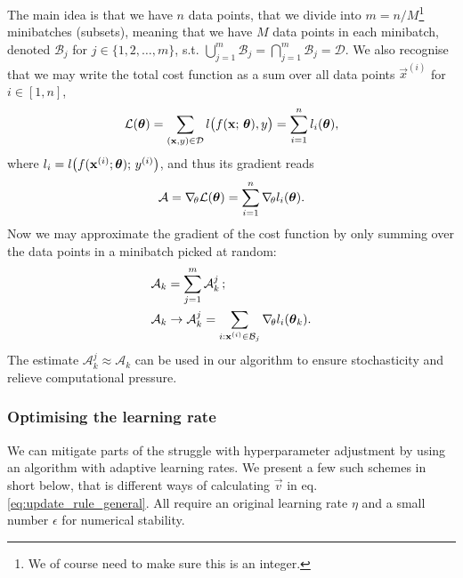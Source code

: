         The main idea is that we have $n$ data points, that we divide into $m=n/M$\footnote{We of course need to make sure this is an integer. } minibatches (subsets), meaning that we have $M$ data points in each minibatch, denoted $\mathcal{B}_j$ for $j\in\{1,2,\dots,m\}$, s.t. $\bigcup_{j=1}^m \mathcal{B}_j = \bigcap_{j=1}^m \mathcal{B}_j = \mathcal{D}$. We also recognise that we may write the total cost function as a sum over all data points $\vec{x}^{(i)}$ for $i\in[1,n]$, 
        \begin{equation}
            \mathcal{L}(\boldsymbol{\theta}) =\sum_{(\mathbf{x}, y)\in \mathcal{D}} l\big(f(\mathbf{x};\,\boldsymbol{\theta}), y \big) = \sum_{i=1}^n l_i(\boldsymbol{\theta}),
        \end{equation}
        where $l_i = l\big(f(\mathbf{x}^{(i)};\boldsymbol{\theta}); \, y^{(i)}\big)$, and thus its gradient reads
        \begin{equation}
            \mathcal{A} = \nabla_{\!\theta} \mathcal{L}(\boldsymbol{\theta}) = \sum_{i=1}^n \nabla_{\!\theta}l_i(\boldsymbol{\theta}).
        \end{equation}
        Now we may approximate the gradient of the cost function by only summing over the data points in a minibatch picked at random:
        \begin{equation}\label{eq:sgd_gradient}
            \begin{split}
            \mathcal{A}_k &= \sum_{j=1}^{m}\mathcal{A}_k^j\, ; \\
            \mathcal{A}_k &\to \mathcal{A}^j_k = \sum_{i:\mathbf{x}^{(i)} \in\mathcal{B}_j }\nabla_{\!\theta} l_i(\boldsymbol{\theta}_k).
            \end{split}
        \end{equation}
        The estimate $\mathcal{A}_k^j \approx \mathcal{A}_k$ can be used in our algorithm to ensure stochasticity and relieve computational pressure.
    
    \subsubsection{Optimising the learning rate}\label{sec:tuning}
    
    We can mitigate parts of the struggle with hyperparameter adjustment by using an algorithm with adaptive learning rates. We present a few such schemes in short below, that is different ways of calculating $\vec{v}$ in eq. \eqref{eq:update_rule_general}. All require an original learning rate $\eta$ and a small number $\epsilon$ for numerical stability. 

